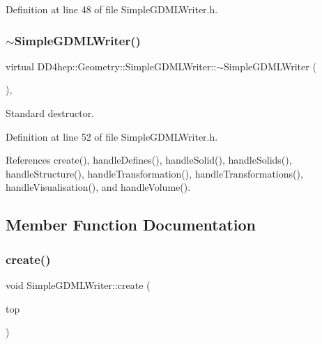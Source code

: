 Definition at line 48 of file Simple\+G\+D\+M\+L\+Writer.\+h.

\hypertarget{class_d_d4hep_1_1_geometry_1_1_simple_g_d_m_l_writer_ae3b2fd4273d79d7e59526531da0e9b96}{}\label{class_d_d4hep_1_1_geometry_1_1_simple_g_d_m_l_writer_ae3b2fd4273d79d7e59526531da0e9b96} 
\subsubsection{\texorpdfstring{$\sim$\+Simple\+G\+D\+M\+L\+Writer()}{~SimpleGDMLWriter()}}
{\footnotesize\ttfamily virtual D\+D4hep\+::\+Geometry\+::\+Simple\+G\+D\+M\+L\+Writer\+::$\sim$\+Simple\+G\+D\+M\+L\+Writer (\begin{DoxyParamCaption}{ }\end{DoxyParamCaption})\hspace{0.3cm}{\ttfamily [inline]}, {\ttfamily [virtual]}}



Standard destructor. 



Definition at line 52 of file Simple\+G\+D\+M\+L\+Writer.\+h.



References create(), handle\+Defines(), handle\+Solid(), handle\+Solids(), handle\+Structure(), handle\+Transformation(), handle\+Transformations(), handle\+Visualisation(), and handle\+Volume().



\subsection{Member Function Documentation}
\hypertarget{class_d_d4hep_1_1_geometry_1_1_simple_g_d_m_l_writer_a0ccf6cfb7ec9346ee6e5bba56f2a151a}{}\label{class_d_d4hep_1_1_geometry_1_1_simple_g_d_m_l_writer_a0ccf6cfb7ec9346ee6e5bba56f2a151a} 
\subsubsection{\texorpdfstring{create()}{create()}}
{\footnotesize\ttfamily void Simple\+G\+D\+M\+L\+Writer\+::create (\begin{DoxyParamCaption}\item[{\hyperlink{class_d_d4hep_1_1_geometry_1_1_det_element}{Det\+Element}}]{top }\end{DoxyParamCaption})}



